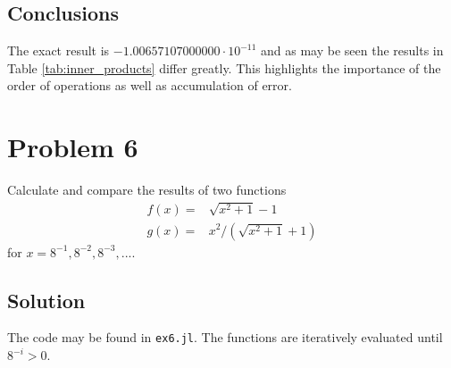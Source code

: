\documentclass[12pt, a4paper]{article}
\newcommand{\code}[1]{\texttt{#1}}
\begin{document}
\subsection{Conclusions}
The exact result is $-1.00657107000000 \cdot 10^{-11}$ and as may be seen the
results in Table \ref{tab:inner_products} differ greatly. This highlights the
importance of the order of operations as well as accumulation of error.

\section{Problem 6}
Calculate and compare the results of two functions
\begin{align*}
  f(x) =& \sqrt{x^2 + 1} - 1 \\
  g(x) =& x^2 / \left( \sqrt{x^2 + 1} + 1 \right)
\end{align*}
for $x = 8^{-1}, 8^{-2}, 8^{-3}, ...$.

\subsection{Solution}
The code may be found in \code{ex6.jl}. The functions are iteratively evaluated
until $8^{-i} > 0$.
\end{document}
